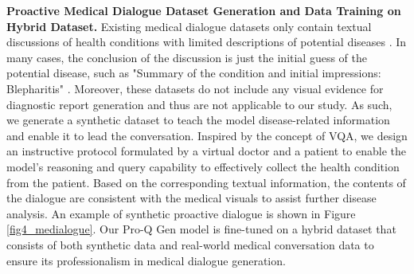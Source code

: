 \textbf{Proactive Medical Dialogue Dataset Generation and Data Training on Hybrid Dataset.} Existing medical dialogue datasets only contain textual discussions of health conditions with limited descriptions of potential diseases \cite{zeng-etal-2020-meddialog,abacha2023empirical, yang2020generation, zhou2021generation}. In many cases, the conclusion of the discussion is just the initial guess of the potential disease, such as "Summary of the condition and initial impressions: Blepharitis" \cite{zeng-etal-2020-meddialog}. Moreover, these datasets do not include any visual evidence for diagnostic report generation and thus are not applicable to our study. As such, we generate a synthetic dataset to teach the model disease-related information and enable it to lead the conversation.  Inspired by the concept of VQA, we design an instructive protocol formulated by a virtual doctor and a patient to enable the model's reasoning and query capability to effectively collect the health condition from the patient. Based on the corresponding textual information, the contents of the dialogue are consistent with the medical visuals to assist further disease analysis. An example of synthetic proactive dialogue is shown in Figure \ref{fig4_medialogue}. Our Pro-Q Gen model is fine-tuned on a hybrid dataset that consists of both synthetic data and real-world medical conversation data \cite{zhang2023huatuogpt} to ensure its professionalism in medical dialogue generation.

